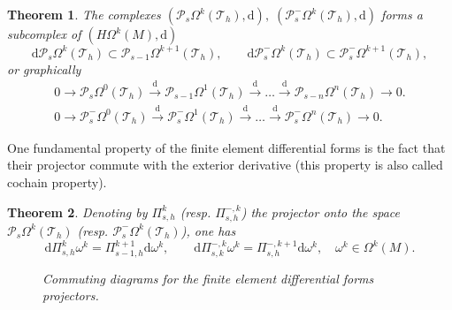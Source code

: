 \documentclass{elsarticle}
\newtheorem{theorem}{Theorem}
\renewcommand\d{\ensuremath{\mathrm{d}}}
\begin{document}
\begin{theorem}{\cite[Lemma 3.8]{arnold2006acta}}\label{th:fe_subcomplex}
The complexes $(\mathcal{P}_s\Omega^k(\mathcal{T}_h), \d), \; (\mathcal{P}_s^-\Omega^k(\mathcal{T}_h), \d)$ forms a subcomplex of $(H\Omega^k(M), \d)$
\begin{equation*}
    \d\mathcal{P}_s\Omega^k(\mathcal{T}_h) \subset \mathcal{P}_{s-1}\Omega^{k+1}(\mathcal{T}_h), \qquad \d\mathcal{P}^-_s\Omega^k(\mathcal{T}_h) \subset \mathcal{P}^-_s\Omega^{k+1}(\mathcal{T}_h),
\end{equation*}
or graphically
\begin{equation*}
\begin{aligned}
    0\longrightarrow \mathcal{P}_s\Omega^0(\mathcal{T}_h) \overset{\d}{\longrightarrow} \mathcal{P}_{s - 1}\Omega^1(\mathcal{T}_h) \overset{\d}{\longrightarrow} \dots \overset{\d}{\longrightarrow} \mathcal{P}_{s - n}\Omega^n(\mathcal{T}_h) \longrightarrow 0.\\
    0 \longrightarrow \mathcal{P}^-_s \Omega^0(\mathcal{T}_h) \overset{\d}{\longrightarrow} \mathcal{P}^-_s \Omega^1(\mathcal{T}_h) \overset{\d}{\longrightarrow} \dots
\overset{\d}{\longrightarrow} \mathcal{P}^-_s \Omega^n(\mathcal{T}_h) \longrightarrow 0.
\end{aligned}
\end{equation*}
\end{theorem}
One fundamental property of the finite element differential forms is the fact that their projector commute with the exterior derivative (this property is also called cochain property). 
\begin{theorem}\cite[Th. 5.2.]{arnold2006acta}
Denoting by  $\Pi_{s, h}^{k}$ (resp. $\Pi_{s, h}^{-, k}$) the projector onto the space $\mathcal{P}_s\Omega^k(\mathcal{T}_h)$ (resp. $\mathcal{P}_s^-\Omega^k(\mathcal{T}_h)$), one has 
\begin{equation}
    \d \Pi_{s, h}^{k} \omega^k = \Pi_{s-1, h}^{k+1} \d \omega^k, \qquad \d \Pi_{s, k}^{-, k} \omega^k = \Pi_{s, h}^{-, k+1} \d \omega^k, \quad \omega^k \in \Omega^k(M).
\end{equation}

\begin{figure}[h]
\centering
{} \hspace{1cm}
\caption{Commuting diagrams for the finite element differential forms projectors.}
\label{fig:cd_FEDF}
\end{figure}
\end{theorem}
\end{document}

